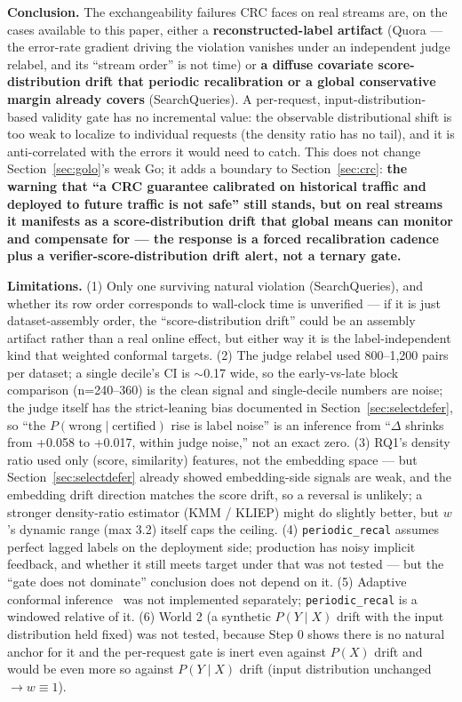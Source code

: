 \documentclass[11pt]{article}
\begin{document}
\textbf{Conclusion.} The exchangeability failures CRC faces on real streams are, on the cases available to this paper, either a \textbf{reconstructed-label artifact} (Quora --- the error-rate gradient driving the violation vanishes under an independent judge relabel, and its ``stream order'' is not time) or \textbf{a diffuse covariate score-distribution drift that periodic recalibration or a global conservative margin already covers} (SearchQueries). A per-request, input-distribution-based validity gate has no incremental value: the observable distributional shift is too weak to localize to individual requests (the density ratio has no tail), and it is anti-correlated with the errors it would need to catch. This does not change Section~\ref{sec:golo}'s weak Go; it adds a boundary to Section~\ref{sec:crc}: \textbf{the warning that ``a CRC guarantee calibrated on historical traffic and deployed to future traffic is not safe'' still stands, but on real streams it manifests as a score-distribution drift that global means can monitor and compensate for --- the response is a forced recalibration cadence plus a verifier-score-distribution drift alert, not a ternary gate.}

\textbf{Limitations.} (1) Only one surviving natural violation (SearchQueries), and whether its row order corresponds to wall-clock time is unverified --- if it is just dataset-assembly order, the ``score-distribution drift'' could be an assembly artifact rather than a real online effect, but either way it is the label-independent kind that weighted conformal targets. (2) The judge relabel used 800--1{,}200 pairs per dataset; a single decile's CI is $\sim$0.17 wide, so the early-vs-late block comparison (n=240--360) is the clean signal and single-decile numbers are noise; the judge itself has the strict-leaning bias documented in Section~\ref{sec:selectdefer}, so ``the $P(\text{wrong} \mid \text{certified})$ rise is label noise'' is an inference from ``$\Delta$ shrinks from +0.058 to +0.017, within judge noise,'' not an exact zero. (3) RQ1's density ratio used only (score, similarity) features, not the embedding space --- but Section~\ref{sec:selectdefer} already showed embedding-side signals are weak, and the embedding drift direction matches the score drift, so a reversal is unlikely; a stronger density-ratio estimator (KMM / KLIEP) might do slightly better, but $w$'s dynamic range (max 3.2) itself caps the ceiling. (4) \texttt{periodic\_\allowbreak{}recal} assumes perfect lagged labels on the deployment side; production has noisy implicit feedback, and whether it still meets target under that was not tested --- but the ``gate does not dominate'' conclusion does not depend on it. (5) Adaptive conformal inference~\cite{aci} was not implemented separately; \texttt{periodic\_\allowbreak{}recal} is a windowed relative of it. (6) World 2 (a synthetic $P(Y \mid X)$ drift with the input distribution held fixed) was not tested, because Step 0 shows there is no natural anchor for it and the per-request gate is inert even against $P(X)$ drift and would be even more so against $P(Y \mid X)$ drift (input distribution unchanged $\to w \equiv 1$).
\end{document}
